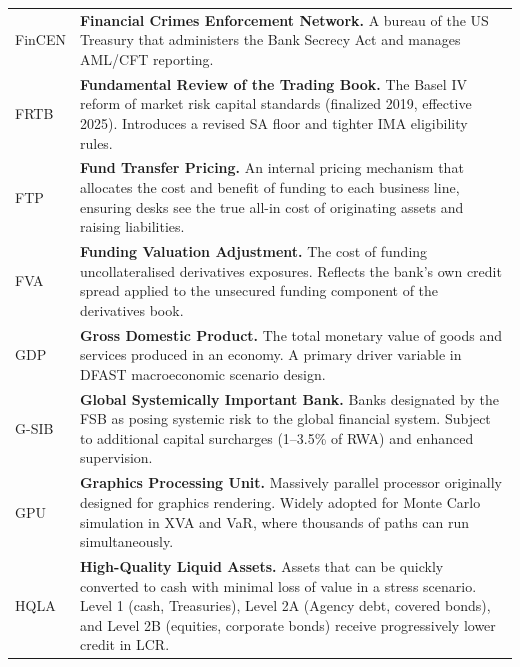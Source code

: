 \documentclass[12pt,a4paper]{article}
\begin{document}
\begin{longtable}{p{3.2cm} p{10.8cm}}
  FinCEN & \textbf{Financial Crimes Enforcement Network.}
           A bureau of the US Treasury that administers the Bank Secrecy
           Act and manages AML/CFT reporting. \\[4pt]

  FRTB  & \textbf{Fundamental Review of the Trading Book.}
          The Basel IV reform of market risk capital standards (finalized 2019,
          effective 2025).  Introduces a revised SA floor and tighter IMA
          eligibility rules. \\[4pt]

  FTP   & \textbf{Fund Transfer Pricing.}
          An internal pricing mechanism that allocates the cost and benefit
          of funding to each business line, ensuring desks see the true
          all-in cost of originating assets and raising liabilities. \\[4pt]

  FVA   & \textbf{Funding Valuation Adjustment.}
          The cost of funding uncollateralised derivatives exposures.
          Reflects the bank's own credit spread applied to the unsecured
          funding component of the derivatives book. \\[4pt]

  GDP   & \textbf{Gross Domestic Product.}
          The total monetary value of goods and services produced in an
          economy.  A primary driver variable in DFAST macroeconomic
          scenario design. \\[4pt]

  G-SIB & \textbf{Global Systemically Important Bank.}
          Banks designated by the FSB as posing systemic risk to the global
          financial system.  Subject to additional capital surcharges
          (1--3.5\% of RWA) and enhanced supervision. \\[4pt]

  GPU   & \textbf{Graphics Processing Unit.}
          Massively parallel processor originally designed for graphics
          rendering.  Widely adopted for Monte Carlo simulation in XVA and
          VaR, where thousands of paths can run simultaneously. \\[4pt]

  HQLA  & \textbf{High-Quality Liquid Assets.}
          Assets that can be quickly converted to cash with minimal loss of
          value in a stress scenario.  Level 1 (cash, Treasuries), Level 2A
          (Agency debt, covered bonds), and Level 2B (equities, corporate
          bonds) receive progressively lower credit in LCR. \\[4pt]


\end{longtable}
\end{document}
